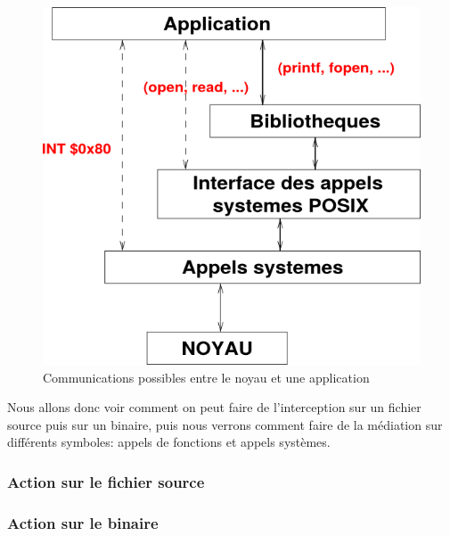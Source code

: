 \begin{figure}[H]
 \centering
 \includegraphics[scale=0.5]{Pictures/Communication_application_noyau.png}
 \caption{Communications possibles entre le noyau et une application}
 \label{AS_Communication}
\end{figure}

Nous allons donc voir comment on peut faire de l'interception sur un fichier source puis sur un binaire, puis nous verrons comment faire de la médiation sur différents symboles: appels de fonctions et appels systèmes.

\subsubsection{Action sur le fichier source}
\subsubsection{Action sur le binaire}
  

